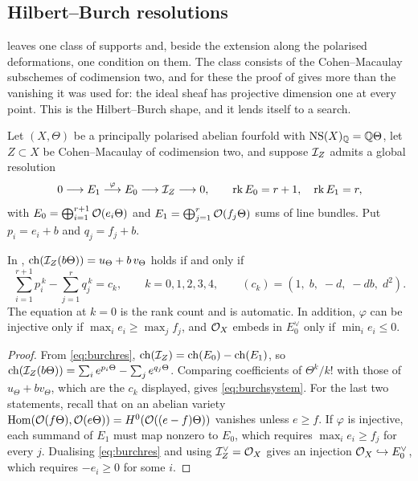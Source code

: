 \subsection{Hilbert--Burch resolutions}
\label{ssec:hilbertburch}

 leaves one class of supports and, beside the
extension along the polarised deformations, one condition on them.
The class consists of the Cohen--Macaulay subschemes of codimension two, and
for these the proof of  gives more than the vanishing
it was used for: the ideal sheaf has projective dimension one at every point.
This is the Hilbert--Burch shape, and it lends itself to a search.

\begin{setupenv}\label{setup:burch}
Let $(X,\Theta)$ be a principally polarised abelian fourfold with
$\mathrm{NS}(X)_{\mathbb{Q}}=\mathbb{Q}\Theta$, let $Z\subset X$ be Cohen--Macaulay of codimension
two, and suppose $\mathcal{I}_{Z}$ admits a global resolution
\begin{equation}\label{eq:burchres}
  0\longrightarrow E_{1}\stackrel{\varphi}{\longrightarrow}E_{0}
  \longrightarrow\mathcal{I}_{Z}\longrightarrow0,
  \qquad \operatorname{rk} E_{0}=r+1,\quad\operatorname{rk} E_{1}=r,
\end{equation}
with $E_{0}=\bigoplus_{i=1}^{r+1}\mathcal{O}(e_{i}\Theta)$ and
$E_{1}=\bigoplus_{j=1}^{r}\mathcal{O}(f_{j}\Theta)$ sums of line bundles. Put
$p_{i}=e_{i}+b$ and $q_{j}=f_{j}+b$.
\end{setupenv}

\begin{lemma}\label{lem:burchmoments}
In , $\operatorname{ch}(\mathcal{I}_{Z}(b\Theta))=u_{\Theta}+b\,v_{\Theta}$ holds
if and only if
\begin{equation}\label{eq:burchsystem}
  \sum_{i=1}^{r+1}p_{i}^{\,k}-\sum_{j=1}^{r}q_{j}^{\,k}=c_{k},
  \qquad k=0,1,2,3,4,
  \qquad (c_{k})=(1,\;b,\;-d,\;-db,\;d^{2}).
\end{equation}
The equation at $k=0$ is the rank count and is automatic. In addition,
$\varphi$ can be injective only if $\max_{i}e_{i}\ge\max_{j}f_{j}$, and
$\mathcal{O}_{X}$ embeds in $E_{0}^{\vee}$ only if $\min_{i}e_{i}\le0$.
\end{lemma}

\begin{proof}
From \eqref{eq:burchres}, $\operatorname{ch}(\mathcal{I}_{Z})=\operatorname{ch}(E_{0})-\operatorname{ch}(E_{1})$, so
$\operatorname{ch}(\mathcal{I}_{Z}(b\Theta))=\sum_{i}e^{p_{i}\Theta}-\sum_{j}e^{q_{j}\Theta}$.
Comparing coefficients of $\Theta^{k}/k!$ with those of
$u_{\Theta}+bv_{\Theta}$, which are the $c_{k}$ displayed, gives
\eqref{eq:burchsystem}. For the last two statements, recall that on an
abelian variety $\operatorname{Hom}(\mathcal{O}(f\Theta),\mathcal{O}(e\Theta))=H^{0}(\mathcal{O}((e-f)\Theta))$
vanishes unless $e\ge f$. If $\varphi$ is injective, each summand of $E_{1}$
must map nonzero to $E_{0}$, which requires $\max_{i}e_{i}\ge f_{j}$ for
every $j$. Dualising \eqref{eq:burchres} and using $\mathcal{I}_{Z}^{\vee}=\mathcal{O}_{X}$
gives an injection $\mathcal{O}_{X}\hookrightarrow E_{0}^{\vee}$, which requires
$-e_{i}\ge0$ for some $i$.
\end{proof}

